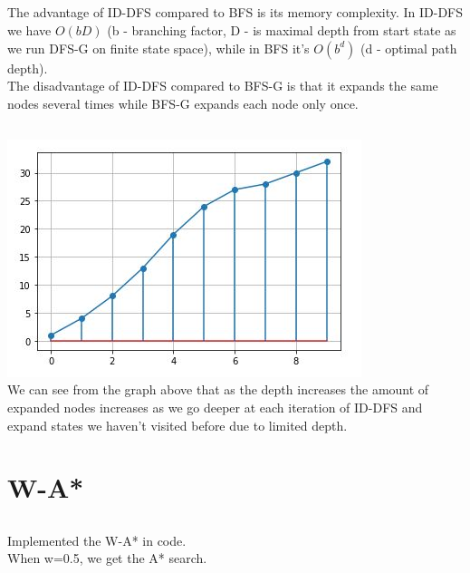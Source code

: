 \documentclass[12pt]{article}
\begin{document}
\subsection{}
The advantage of ID-DFS compared to BFS is its memory complexity. In ID-DFS we have $O(bD)$ (b - branching factor, D - is maximal depth from start state as we run DFS-G on finite state space), while in BFS it's $O(b^d)$ (d - optimal path depth).\\
The disadvantage of ID-DFS compared to BFS-G is that it expands the same nodes several times while BFS-G expands each node only once.

\subsection{}
\includegraphics[scale=1]{id_dfs_plot.JPG}\\
We can see from the graph above that as the depth increases the amount of expanded nodes increases as we go deeper at each iteration of ID-DFS and expand states we haven't visited before due to limited depth.

\section{W-A*}
\subsection{}
Implemented the W-A* in code.\\
When w=0.5, we get the A* search.
\end{document}
